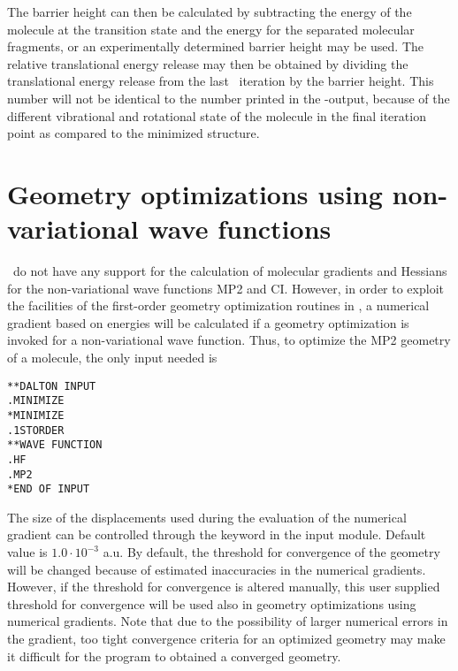 The barrier height can then be calculated by subtracting the energy of
the molecule at the transition state and the energy for the separated
molecular fragments, or an experimentally determined barrier height
may be used. The relative translational energy release may then be
obtained  by dividing the translational energy release
from the last \siraba\ iteration by the barrier height. This number will
not be identical to the number printed in the \siraba -output, because
of the different vibrational and rotational state of
the molecule in the final iteration point as compared to the minimized
structure.

\section{Geometry optimizations using non-variational wave
functions}\label{sec:nonvargeom}

\siraba\ do not have any support for the calculation of molecular
gradients and Hessians for the non-variational wave functions MP2 and
CI. However, in order to
exploit the facilities of the first-order
geometry optimization routines in \siraba , a numerical
gradient based
on energies will be calculated if a geometry optimization is invoked
for a non-variational wave function. Thus, to optimize the MP2
geometry of a molecule, the only input needed is

\begin{verbatim}
**DALTON INPUT
.MINIMIZE
*MINIMIZE
.1STORDER
**WAVE FUNCTION
.HF
.MP2
*END OF INPUT
\end{verbatim}

The size of the displacements used during the evaluation of the
numerical gradient can be controlled through the keyword
 in the  input module. Default value is
$1.0\cdot 10^{-3}$ a.u. By default, the threshold for convergence
of the geometry will be changed because of estimated inaccuracies
in the numerical gradients. However, if the threshold for
convergence is altered manually, this user supplied threshold for
convergence will be used also in geometry optimizations using
numerical gradients. Note that due to
the possibility of larger numerical errors in the gradient, too
tight convergence criteria for an optimized geometry may make it
difficult for the program to obtained a converged geometry.
